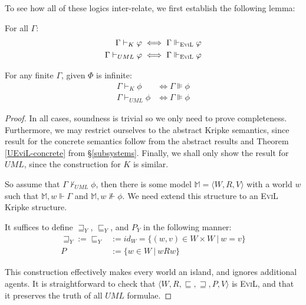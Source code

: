 
To see how all of these logics inter-relate, we first establish the
following lemma:

\begin{lemma}\label{UML-K-Completeness}
For all $\Gamma$:
\begin{align*}
\Gamma \vdash_K \phi & \iff  \Gamma \Vdash_{\textsc{EviL}} \phi \\
\Gamma \vdash_{UML} \phi & \iff  \Gamma \Vdash_{\textsc{EviL}} \phi 
\end{align*}

For any finite $\Gamma$, given $\Phi$ is infinite:
\begin{align*}
              \Gamma \vdash_K \phi          & \iff  \Gamma \VDash \phi
              \\
              \Gamma \vdash_{UML} \phi          & \iff  \Gamma \VDash \phi
\end{align*}
\end{lemma}
\begin{proof}
In all cases, soundness is trivial so we only need to prove completeness.
Furthermore, we may restrict ourselves to the abstract Kripke
semantics, since result for the concrete semantics follow 
from the abstract results and
 Theorem \ref{UEviL-concrete} from \S\ref{subsystems}.  Finally, we
 shall only show the result for $UML$, since the construction for $K$ is
 similar.

So assume that $\Gamma \nvdash_{UML} \phi$, then there is some model
$\mathbb{M}= \langle W, R, V\rangle$ with a world $w$ such that $\mathbb{M}, w \Vdash \Gamma$
and $\mathbb{M}, w \nVdash \phi$. We need extend this structure to an \textsc{EviL} Kripke
structure.

 It suffices to define
$\sqsupseteq_Y$, $\sqsubseteq_Y$, and $P_Y$ in the following manner:
\begin{align*}
  \sqsupseteq_Y := \sqsubseteq_Y & := id_W = \{(w,v) \in W \times W\
  |\ w = v\}  \\
  P & := \{w \in W \ |\ w R w\} 
\end{align*}

This construction effectively makes every world an island, and ignores
additional agents.  It is straightforward to check that $\langle W,
R, \sqsubseteq, \sqsupseteq, P, V\rangle$ is \textsc{EviL}, and that
it preserves the truth of all $UML$ formulae.
\end{proof}

